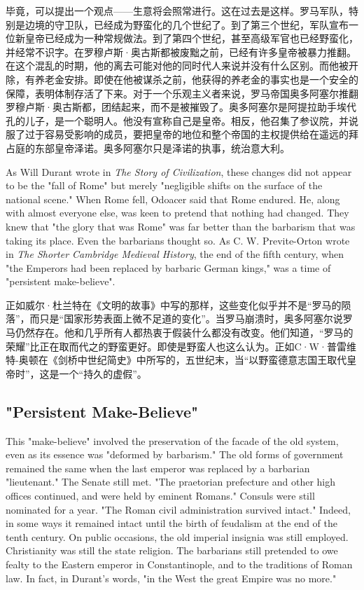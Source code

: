 \begin{Parallel}{97mm}{45mm}
  \ParallelRText
  {毕竟，可以提出一个观点——生意将会照常进行。这在过去是这样。罗马军队，特别是边境的守卫队，已经成为野蛮化的几个世纪了。到了第三个世纪，军队宣布一位新皇帝已经成为一种常规做法。到了第四个世纪，甚至高级军官也已经野蛮化，并经常不识字。在罗穆卢斯·奥古斯都被废黜之前，已经有许多皇帝被暴力推翻。在这个混乱的时期，他的离去可能对他的同时代人来说并没有什么区别。而他被开除，有养老金安排。即使在他被谋杀之前，他获得的养老金的事实也是一个安全的保障，表明体制存活了下来。对于一个乐观主义者来说，罗马帝国奥多阿塞尔推翻罗穆卢斯·奥古斯都，团结起来，而不是被摧毁了。奥多阿塞尔是阿提拉助手埃代孔的儿子，是一个聪明人。他没有宣称自己是皇帝。相反，他召集了参议院，并说服了过于容易受影响的成员，要把皇帝的地位和整个帝国的主权提供给在遥远的拜占庭的东部皇帝泽诺。奥多阿塞尔只是泽诺的执事，统治意大利。}
  \ParallelPar



  \ParallelLText
  {As Will Durant wrote in \emph{The Story of Civilization}, these changes did not appear to be the "fall of Rome" but merely "negligible shifts on the surface of the national scene." When Rome fell, Odoacer said that Rome endured. He, along with almost everyone else, was keen to pretend that nothing had changed. They knew that "the glory that was Rome" was far better than the barbarism that was taking its place. Even the barbarians thought so. As C. W. Previte-Orton wrote in \emph{The Shorter Cambridge Medieval History}, the end of the fifth century, when "the Emperors had been replaced by barbaric German kings," was a time of "persistent make-believe".}
  
  \ParallelRText
  {正如威尔·杜兰特在《文明的故事》中写的那样，这些变化似乎并不是“罗马的陨落”，而只是“国家形势表面上微不足道的变化”。当罗马崩溃时，奥多阿塞尔说罗马仍然存在。他和几乎所有人都热衷于假装什么都没有改变。他们知道，“罗马的荣耀”比正在取而代之的野蛮更好。即使是野蛮人也这么认为。正如C·W·普雷维特-奥顿在《剑桥中世纪简史》中所写的，五世纪末，当“以野蛮德意志国王取代皇帝时”，这是一个“持久的虚假”。}
  \ParallelPar

  \subsection{"Persistent Make-Believe"}

  \ParallelLText
  {This "make-believe" involved the preservation of the facade of the old system, even as its essence was "deformed by barbarism." The old forms of government remained the same when the last emperor was replaced by a barbarian "lieutenant." The Senate still met. "The praetorian prefecture and other high offices continued, and were held by eminent Romans." Consuls were still nominated for a year. "The Roman civil administration survived intact." Indeed, in some ways it remained intact until the birth of feudalism at the end of the tenth century. On public occasions, the old imperial insignia was still employed. Christianity was still the state religion. The barbarians still pretended to owe fealty to the Eastern emperor in Constantinople, and to the traditions of Roman law. In fact, in Durant's words, "in the West the great Empire was no more." }
  

\end{Parallel}
